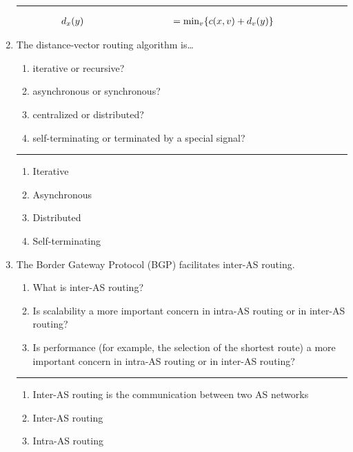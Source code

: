 \documentclass[twoside]{article}
\newenvironment{answer}
  {\vspace*{0.2cm} \rule{12cm}{0.04cm} \vspace*{0.2cm}}
  {\vspace*{0.2cm}}
\begin{document}
\begin{enumerate}
  \begin{answer}

  \begin{align*}
    \parbox{4cm}{$d_x(y)$} & = \parbox{4cm}{${\min}_v\{c(x,v)+d_v(y)\}$}
    \end{align*}

    \end{answer}

  \item The distance-vector routing algorithm is\ldots
  \begin{enumerate}
    \item iterative or recursive?
    \item asynchronous or synchronous?
    \item centralized or distributed?
    \item self-terminating or terminated by a special signal?
    \end{enumerate}

  \begin{answer}

  \begin{enumerate}
    \item Iterative
    \item Asynchronous
    \item Distributed
    \item Self-terminating
    \end{enumerate}

    \end{answer}

  \item The Border Gateway Protocol (BGP) facilitates inter-AS routing.
  \begin{enumerate}
    \item What is inter-AS routing?
    \item Is scalability a more important concern in intra-AS routing
      or in inter-AS routing?
    \item Is performance (for example, the selection of the shortest
      route) a more important concern in intra-AS routing or
      in inter-AS routing?
    \end{enumerate}

  \begin{answer}

  \begin{enumerate}
    \item Inter-AS routing is the communication between two AS networks 
    \item Inter-AS routing 
    \item Intra-AS routing
    \end{enumerate}


\end{answer}
\end{enumerate}
\end{document}
